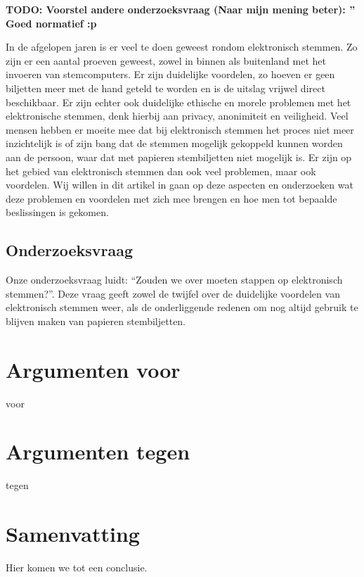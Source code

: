 \documentclass[a4paper]{article}
\newcommand{\TODO}[1]{{\color{red}\textbf{TODO: #1}}}
\begin{document}
\TODO{Voorstel andere onderzoeksvraag (Naar mijn mening beter): '' Goed normatief :p}

In de afgelopen jaren is er veel te doen geweest rondom elektronisch stemmen. Zo zijn er een aantal proeven geweest, zowel in binnen als buitenland met het invoeren van stemcomputers. Er zijn duidelijke voordelen, zo hoeven er geen biljetten meer met de hand geteld te worden en is de uitslag vrijwel direct beschikbaar. Er zijn echter ook duidelijke ethische en morele problemen met het elektronische stemmen, denk hierbij aan privacy, anonimiteit en veiligheid. Veel mensen hebben er moeite mee dat bij elektronisch stemmen het proces niet meer inzichtelijk is of zijn bang dat de stemmen mogelijk gekoppeld kunnen worden aan de persoon, waar dat met papieren stembiljetten niet mogelijk is.
Er zijn op het gebied van elektronisch stemmen dan ook veel problemen, maar ook voordelen. Wij willen in dit artikel in gaan op deze aspecten en onderzoeken wat deze problemen en voordelen met zich mee brengen en hoe men tot bepaalde beslissingen is gekomen.

\subsection{Onderzoeksvraag}

Onze onderzoeksvraag luidt: ``Zouden we over moeten stappen op elektronisch stemmen?''. Deze vraag geeft zowel de twijfel over de duidelijke voordelen van elektronisch stemmen weer, als de onderliggende redenen om nog altijd gebruik te blijven maken van papieren stembiljetten.

\section{Argumenten voor}

voor

\section{Argumenten tegen}

tegen


\section{Samenvatting}

Hier komen we tot een conclusie.



\renewcommand\refname{Literatuur}

\end{document}
